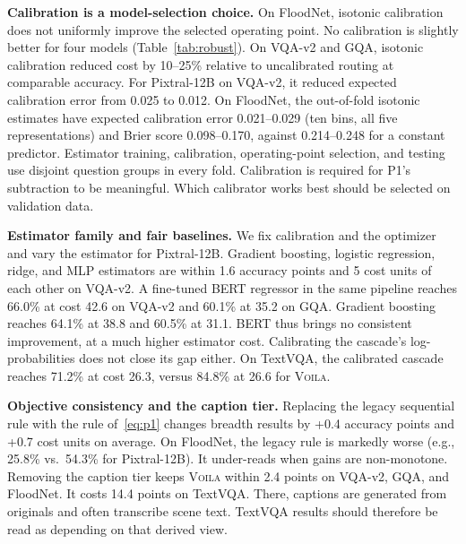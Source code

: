 \documentclass[10pt,conference]{IEEEtran}
\newcommand{\system}{\textsc{Voila}\xspace}
\newcommand{\mPix}{Pixtral-12B\xspace}
\begin{document}
\textbf{Calibration is a model-selection choice.} On FloodNet, isotonic
calibration does not uniformly improve the selected operating point. No
calibration is slightly better for four models (Table~\ref{tab:robust}). On
VQA-v2 and GQA, isotonic calibration reduced cost by 10--25\% relative to
uncalibrated routing at comparable accuracy. For \mPix on VQA-v2, it reduced
expected calibration error from 0.025 to 0.012. %
On FloodNet, the out-of-fold isotonic estimates have expected calibration error
0.021--0.029 (ten bins, all five representations) and Brier score
0.098--0.170, against 0.214--0.248 for a constant predictor. Estimator
training, calibration, operating-point selection, and testing use disjoint
question groups in every fold.
Calibration is required for P1's subtraction to be meaningful. Which calibrator
works best should be selected on validation data.

\textbf{Estimator family and fair baselines.} We fix calibration and the
optimizer and vary the estimator for \mPix. Gradient boosting, logistic
regression, ridge, and MLP estimators are within 1.6 accuracy points and 5 cost
units of each other on VQA-v2. A fine-tuned BERT regressor in the same pipeline
reaches 66.0\% at cost 42.6 on VQA-v2 and 60.1\% at 35.2 on GQA. Gradient
boosting reaches 64.1\% at 38.8 and 60.5\% at 31.1. BERT thus brings no
consistent improvement, at a much higher estimator cost. Calibrating the
cascade's log-probabilities does not close its gap either. On TextVQA, the
calibrated cascade reaches 71.2\% at cost 26.3, versus 84.8\% at 26.6 for
\system.

\textbf{Objective consistency and the caption tier.} Replacing the legacy
sequential rule with the rule of~\eqref{eq:p1} changes breadth results by
+0.4 accuracy points and +0.7 cost units on average. On FloodNet, the legacy
rule is markedly worse (e.g., 25.8\% vs.\ 54.3\% for \mPix). It under-reads when
gains are non-monotone. Removing the caption tier keeps \system within 2.4
points on VQA-v2, GQA, and FloodNet. It costs 14.4 points on TextVQA. There,
captions are generated from originals and often transcribe scene text. TextVQA
results should therefore be read as depending on that derived view.
\end{document}
